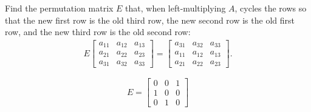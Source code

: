 \documentclass[reqno, answers]{exam}
\begin{document}
\begin{questions}
  \newpage
    \question[5]
    Find the permutation matrix $E$ that, when left-multiplying $A$, cycles the rows so that the new first row is the old third row, the new second row is the old first row, and the new third row is the old second row:
    \begin{align*}
      E \begin{bmatrix}
          a_{11} & a_{12} & a_{13} \\
          a_{21} & a_{22} & a_{23} \\
          a_{31} & a_{32} & a_{33}
        \end{bmatrix}
      =
      \begin{bmatrix}
        a_{31} & a_{32} & a_{33} \\
        a_{11} & a_{12} & a_{13} \\
        a_{21} & a_{22} & a_{23}
      \end{bmatrix}.
    \end{align*}
    \begin{solution}
      $$E = \begin{bmatrix} 0 & 0 & 1 \\ 1 & 0 & 0 \\ 0 & 1 & 0 \end{bmatrix}$$
    \end{solution}



\end{questions}
\end{document}
